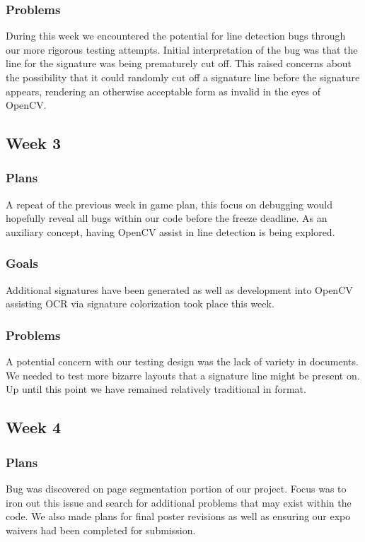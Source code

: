 \documentclass[onecolumn, draftclsnofoot,10pt, compsoc]{IEEEtran}
\begin{document}
\subsubsection{Problems}
During this week we encountered the potential for line detection bugs through our more rigorous testing attempts. Initial interpretation of the bug was that the line for the signature was being prematurely cut off. This raised concerns about the possibility that it could randomly cut off a signature line before the signature appears, rendering an otherwise acceptable form as invalid in the eyes of OpenCV.

\subsection{Week 3}
\subsubsection{Plans}
A repeat of the previous week in game plan, this focus on debugging would hopefully reveal all bugs within our code before the freeze deadline. As an auxiliary concept, having OpenCV assist in line detection is being explored.

\subsubsection{Goals}
Additional signatures have been generated as well as development into OpenCV assisting OCR via signature colorization took place this week. 

\subsubsection{Problems}
A potential concern with our testing design was the lack of variety in documents. We needed to test more bizarre layouts that a signature line might be present on. Up until this point we have remained relatively traditional in format.

\subsection{Week 4}
\subsubsection{Plans}
Bug was discovered on page segmentation portion of our project. Focus was to iron out this issue and search for additional problems that may exist within the code. We also made plans for final poster revisions as well as ensuring our expo waivers had been completed for submission.
\end{document}
